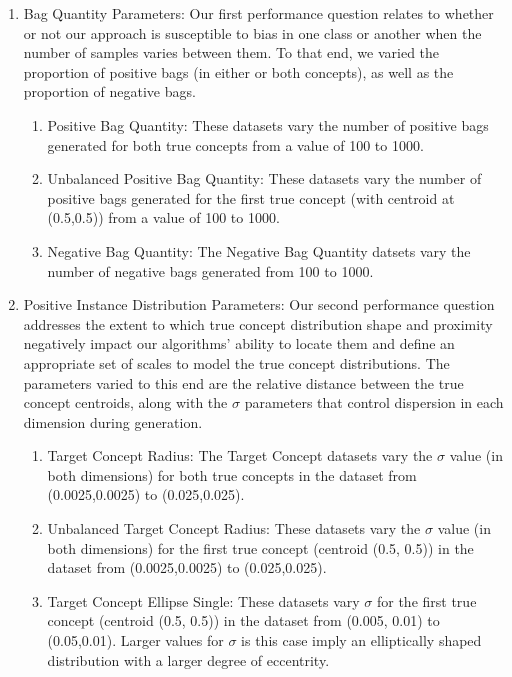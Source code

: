 \documentclass[12pt,dvips]{report}
\numberwithin{equation}{section}
\begin{document}
\begin{enumerate}

  \item Bag Quantity Parameters: Our first performance question relates to whether or not our approach is susceptible to bias in one class or another when the number of samples varies between them.  To that end, we varied the proportion of positive bags (in either or both concepts), as well as the proportion of negative bags.
	
	\begin{enumerate}
	
	\item Positive Bag Quantity: These datasets vary the number of positive bags generated for both true concepts from a value of 100 to 1000.

	\item Unbalanced Positive Bag Quantity: These datasets vary the number of positive bags generated for the first true concept (with centroid at (0.5,0.5)) from a value of 100 to 1000.

	\item Negative Bag Quantity: The Negative Bag Quantity datsets vary the number of negative bags generated from 100 to 1000.
	\end{enumerate}
       
\item Positive Instance Distribution Parameters: Our second performance question addresses the extent to which true concept distribution shape and proximity negatively impact our algorithms' ability to locate them and define an appropriate set of scales to model the true concept distributions.  The parameters varied to this end are the relative distance between the true concept centroids, along with the $\sigma$ parameters that control dispersion in each dimension during generation.
	
	\begin{enumerate}
	
	\item Target Concept Radius: The Target Concept datasets vary the $\sigma$ value (in both dimensions) for both true concepts in the dataset from (0.0025,0.0025) to (0.025,0.025).
	
	\item Unbalanced Target Concept Radius: These datasets vary the $\sigma$ value (in both dimensions) for the first true concept (centroid (0.5, 0.5)) in the dataset from (0.0025,0.0025) to (0.025,0.025).
	
	\item Target Concept Ellipse Single: These datasets vary $\sigma$ for the first true concept (centroid (0.5, 0.5)) in the dataset from (0.005, 0.01) to (0.05,0.01).  Larger values for $\sigma$ is this case imply an elliptically shaped distribution with a larger degree of eccentrity.
	

\end{enumerate}
\end{enumerate}
\end{document}
